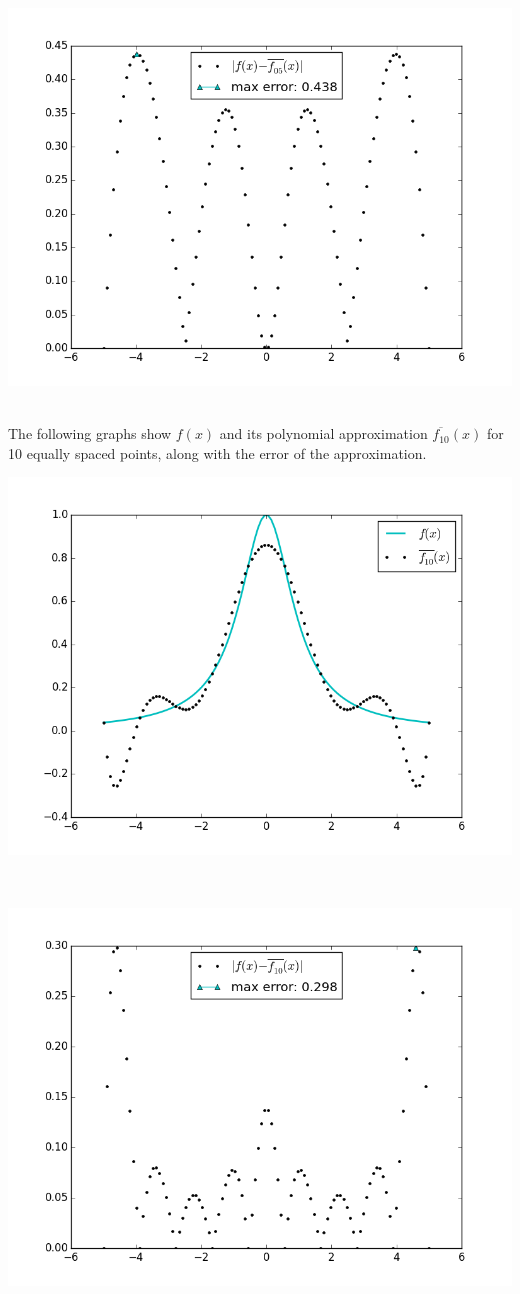\documentclass[12pt]{article}
\begin{document}
\centerline{\includegraphics[scale=0.65]{figures/problem4_e_005points.png}}\\
The following graphs show $f(x)$ and its polynomial approximation $\overline{f_{10}}(x)$ for 10 equally spaced points, along with the error of the approximation.\\
\centerline{\includegraphics[scale=0.65]{figures/problem4_d_010points.png}}\\
\centerline{\includegraphics[scale=0.65]{figures/problem4_e_010points.png}}\\
\end{document}
